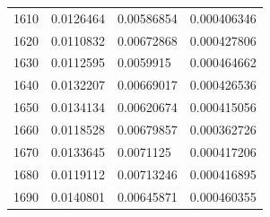 \begin{center}
\begin{longtable}{l|l|l|l}
1610                                                   & 0.0126464                                                         & 0.00586854                                               & 0.000406346                                                        \\
1620                                                   & 0.0110832                                                         & 0.00672868                                               & 0.000427806                                                        \\
1630                                                   & 0.0112595                                                         & 0.0059915                                                & 0.000464662                                                        \\
1640                                                   & 0.0132207                                                         & 0.00669017                                               & 0.000426536                                                        \\
1650                                                   & 0.0134134                                                         & 0.00620674                                               & 0.000415056                                                        \\
1660                                                   & 0.0118528                                                         & 0.00679857                                               & 0.000362726                                                        \\
1670                                                   & 0.0133645                                                         & 0.0071125                                                & 0.000417206                                                        \\
1680                                                   & 0.0119112                                                         & 0.00713246                                               & 0.000416895                                                        \\
1690                                                   & 0.0140801                                                         & 0.00645871                                               & 0.000460355                                                        \\

\end{longtable}
\end{center}
